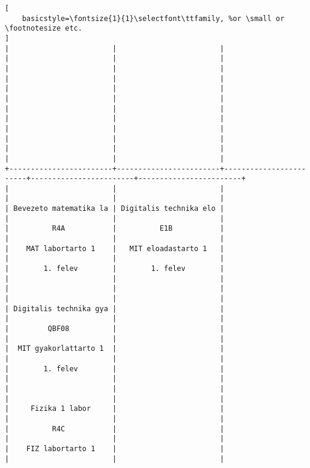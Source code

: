 \begin{lstlisting}[
    basicstyle=\fontsize{1}{1}\selectfont\ttfamily, %or \small or \footnotesize etc.
]
|                        |                        |                        |                        |                        | 
|                        |                        |                        |                        |                        | 
|                        |                        |                        |                        |                        | 
|                        |                        |                        |                        |                        | 
|                        |                        |                        |                        |                        | 
|                        |                        |                        |                        |                        | 
+------------------------+------------------------+------------------------+------------------------+------------------------+
|                        |                        |                        |                        |                        | 
| Bevezeto matematika la | Digitalis technika elo |                        |                        |                        | 
|          R4A           |          E1B           |                        |                        |                        | 
|    MAT labortarto 1    |   MIT eloadastarto 1   |                        |                        |                        | 
|        1. felev        |        1. felev        |                        |                        |                        | 
|                        |                        |                        |                        |                        | 
| Digitalis technika gya |                        |                        |                        |                        | 
|         QBF08          |                        |                        |                        |                        | 
|  MIT gyakorlattarto 1  |                        |                        |                        |                        | 
|        1. felev        |                        |                        |                        |                        | 
|                        |                        |                        |                        |                        | 
|     Fizika 1 labor     |                        |                        |                        |                        | 
|          R4C           |                        |                        |                        |                        | 
|    FIZ labortarto 1    |                        |                        |                        |                        | 

\end{lstlisting}
